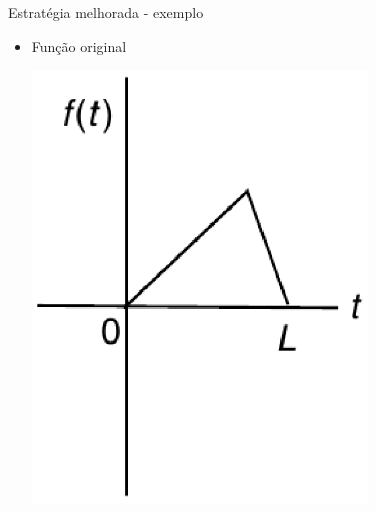       \begin{slide}{Estratégia melhorada - exemplo}
	      \twocolumn
	      {
		      \begin{itemize}
			      \item Função original\\
				      \begin{center}
				      \includegraphics[width=0.7\textwidth]{figs/func}
				      \end{center}
		      \end{itemize}

}
\end{slide}
